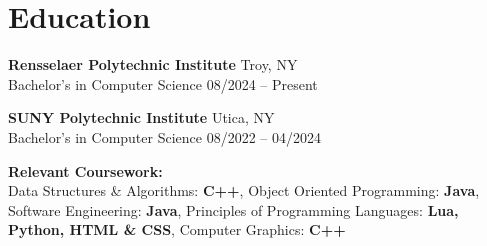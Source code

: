 \section*{Education}
\resumeSubHeadingListStart

\item
\textbf{Rensselaer Polytechnic Institute} \hfill Troy, NY \\
Bachelor’s in Computer Science \hfill 08/2024 -- Present


\item
\textbf{SUNY Polytechnic Institute} \hfill Utica, NY \\
Bachelor’s in Computer Science \hfill 08/2022 -- 04/2024

\textbf{Relevant Coursework:} \\
Data Structures \& Algorithms: \textbf{C++}, 
Object Oriented Programming: \textbf{Java}, 
Software Engineering: \textbf{Java},
Principles of Programming Languages: \textbf{Lua, Python, HTML \& CSS}, 
Computer Graphics: \textbf{C++}

\resumeSubHeadingListEnd